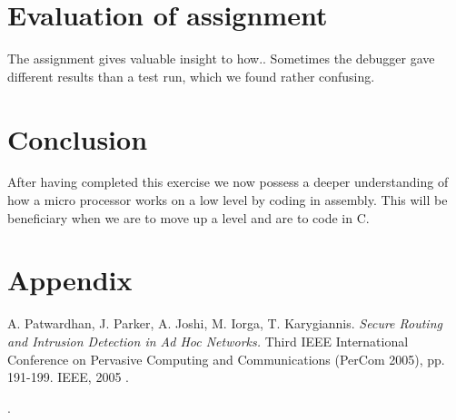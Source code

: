 \documentclass[a4paper,11pt]{article}
\begin{document}
\section{Evaluation of assignment}
The assignment gives valuable insight to how..
Sometimes the debugger gave different results than a test run, which we found rather confusing. 

\section{Conclusion}
After having completed this exercise we now possess a deeper understanding of how a micro processor works on a low level by coding in assembly. This will be beneficiary when we are to move up a level and are to code in C. 

\section{Appendix}


\footnotesize{  %
\begin{thebibliography}{N}

 A. Patwardhan, J. Parker, A. Joshi, M. Iorga, T. Karygiannis.
\textit{Secure Routing and Intrusion Detection in Ad Hoc Networks.}
Third IEEE International Conference on Pervasive Computing and Communications (PerCom 2005), pp. 191-199. IEEE, 2005 .


\end{thebibliography}.  
}
\end{document}
